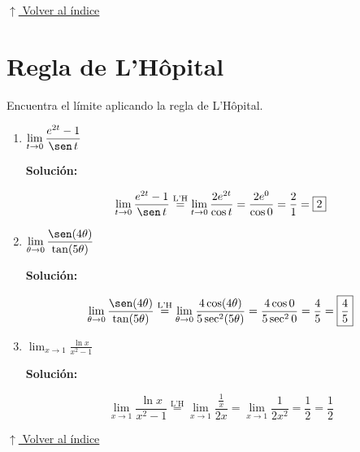 \documentclass[12pt]{article}
\newcommand{\solucion}{%
    \vspace{0.8em}%
    \textbf{Solución:}%
}
\newcommand{\volverindice}{%
    \vspace{1em}%
    \begin{flushright}%
        \hyperlink{indice}{\small $\uparrow$ Volver al índice}%
    \end{flushright}%
}
\begin{document}
\volverindice

\section{Regla de L'Hôpital}

Encuentra el límite aplicando la regla de L'Hôpital.

\begin{enumerate}[label=\alph*.-]
    \item $\displaystyle\lim_{t \to 0} \frac{e^{2t}-1}{\sen\,t}$

    \solucion

    \[
    \lim_{t \to 0} \frac{e^{2t}-1}{\sen\,t} \stackrel{\text{L'H}}{=}
    \lim_{t \to 0} \frac{2e^{2t}}{\cos t} = \frac{2e^0}{\cos 0} = \frac{2}{1} = \boxed{2}
    \]

    \item $\displaystyle\lim_{\theta \to 0} \frac{\sen(4\theta)}{\tan(5\theta)}$

    \solucion

    \[
    \lim_{\theta \to 0} \frac{\sen(4\theta)}{\tan(5\theta)} \stackrel{\text{L'H}}{=}
    \lim_{\theta \to 0} \frac{4\cos(4\theta)}{5\sec^2(5\theta)} = \frac{4\cos 0}{5\sec^2 0} = \frac{4}{5} = \boxed{\dfrac{4}{5}}
    \]

    \item $\displaystyle\lim_{x \to 1} \frac{\ln x}{x^2-1}$

    \solucion

    \[
    \lim_{x \to 1} \frac{\ln x}{x^2-1} \stackrel{\text{L'H}}{=}
    \lim_{x \to 1} \frac{\tfrac{1}{x}}{2x} = \lim_{x \to 1} \frac{1}{2x^2} = \frac{1}{2} = \boxed{\dfrac{1}{2}}
    \]
\end{enumerate}

\volverindice
\end{document}
